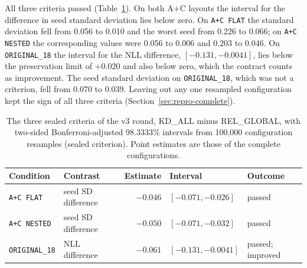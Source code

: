 All three criteria passed
(Table~\ref{tab:results-v3-criteria}). On
both A+C layouts the interval for the difference in seed standard
deviation lies below zero. On \texttt{A+C FLAT} the standard deviation
fell from 0.056 to 0.010 and the worst seed from 0.226 to 0.066; on
\texttt{A+C NESTED} the corresponding values were 0.056 to 0.006 and
0.203 to 0.046. On \texttt{ORIGINAL\_18} the interval for the NLL
difference, $[-0.131, -0.0041]$, lies below the preservation limit of
$+0.020$ and also below zero, which the contract counts as
improvement. The
seed standard deviation on \texttt{ORIGINAL\_18}, which was not a
criterion, fell from 0.070 to 0.039. Leaving out any one resampled
configuration kept the sign of all three criteria
(Section~\ref{sec:repro-complete}).

\begin{table}[htbp]
\centering
\caption[The three sealed criteria of the v3 round]{The three sealed criteria of the v3 round, KD\_ALL minus
REL\_GLOBAL, with two-sided Bonferroni-adjusted 98.3333\% intervals from
100,000 configuration resamples (sealed criterion). Point estimates
are those of the complete configurations.}
\label{tab:results-v3-criteria}
\small
\begin{tabular}{@{}llrll@{}}
\toprule
Condition & Contrast & Estimate & Interval & Outcome \\
\midrule
\texttt{A+C FLAT}     & seed SD difference & $-0.046$ & $[-0.071, -0.026]$
  & passed \\
\texttt{A+C NESTED}   & seed SD difference & $-0.050$ & $[-0.071, -0.032]$
  & passed \\
\texttt{ORIGINAL\_18} & NLL difference     & $-0.061$ & $[-0.131, -0.0041]$
  & passed; improved \\
\bottomrule
\end{tabular}
\end{table}

